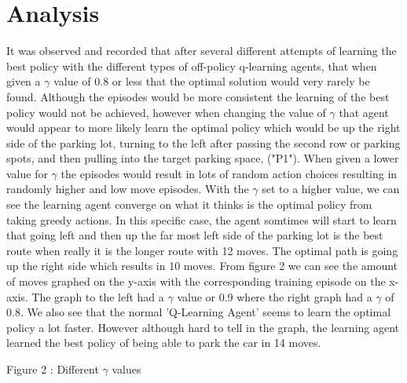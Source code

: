 \documentclass[letterpaper]{article}
\begin{document}
\section{Analysis}

It was observed and recorded that after several different attempts of learning the best policy with the different types of off-policy q-learning agents, that when given a $\gamma$ value of 0.8 or less that the optimal solution would very rarely be found.  Although the episodes would be more consistent the learning of the best policy would not be achieved, however when changing the value of $\gamma$ that agent would appear to more likely learn the optimal policy which would be up the right side of the parking lot, turning to the left after passing the second row or parking spots, and then pulling into the target parking space, ("P1").  When given a lower value for $\gamma$ the episodes would result in lots of random action choices resulting in randomly higher and low move episodes.  With the $\gamma$ set to a higher value, we can see the learning agent converge on what it thinks is the optimal policy from taking greedy actions. In this specific case, the agent somtimes will start to learn that going left and then up the far most left side of the parking lot is the best route when really it is the longer route with 12 moves.  The optimal path is going up the right side which results in 10 moves. 
From figure 2 we can see the amount of moves graphed on the y-axis with the corresponding training episode on the x-axis. The graph to the left had a $\gamma $ value or 0.9 where the right graph had a $\gamma$ of 0.8. We also see that the normal 'Q-Learning Agent' seems to learn the optimal policy a lot faster.  However although hard to tell in the graph, the learning agent learned the best policy of being able to park the car in 14 moves.  

\begin{center}

Figure 2 : Different $\gamma$ values 
\end{center}
\end{document}
